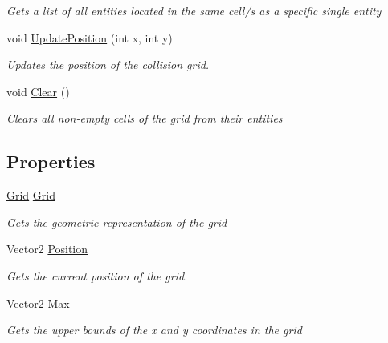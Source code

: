 \begin{DoxyCompactItemize}
\begin{DoxyCompactList}\small\item\em Gets a list of all entities located in the same cell/s as a specific single entity \end{DoxyCompactList}\item 
void \hyperlink{class_m_b2_d_1_1_collision_1_1_collision_map_a8f34c934947ce25d7de681fc07f14e09}{Update\+Position} (int x, int y)
\begin{DoxyCompactList}\small\item\em Updates the position of the collision grid. \end{DoxyCompactList}\item 
void \hyperlink{class_m_b2_d_1_1_collision_1_1_collision_map_ac7eeef6db2deadf738ea40ff939759ff}{Clear} ()
\begin{DoxyCompactList}\small\item\em Clears all non-\/empty cells of the grid from their entities \end{DoxyCompactList}\end{DoxyCompactItemize}
\subsection*{Properties}
\begin{DoxyCompactItemize}
\item 
\hyperlink{class_m_b2_d_1_1_geometry_1_1_grid}{Grid} \hyperlink{class_m_b2_d_1_1_collision_1_1_collision_map_aacfa35801f16fad4ea0d128edf522095}{Grid}
\begin{DoxyCompactList}\small\item\em Gets the geometric representation of the grid \end{DoxyCompactList}\item 
Vector2 \hyperlink{class_m_b2_d_1_1_collision_1_1_collision_map_a0d069be50f64db9f09d488dc2642ee48}{Position}
\begin{DoxyCompactList}\small\item\em Gets the current position of the grid. \end{DoxyCompactList}\item 
Vector2 \hyperlink{class_m_b2_d_1_1_collision_1_1_collision_map_a707dab6ca65cfe316c248976a0d750f6}{Max}
\begin{DoxyCompactList}\small\item\em Gets the upper bounds of the x and y coordinates in the grid \end{DoxyCompactList}\end{DoxyCompactItemize}


